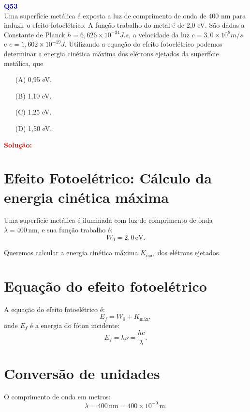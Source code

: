 \documentclass[a4paper,12pt]{article}
\begin{document}
\begin{flushleft}
\textbf{\textcolor{blue}{\Large Q53}}\\
\noindent
Uma superfície metálica é exposta a luz de comprimento de onda de 400 nm para induzir o efeito fotoelétrico. A função
trabalho do metal é de 2,0 eV. São dadas a Constante de Planck $h = 6{,}626 \times 10^{-34} J.s$, a velocidade da luz 
$c = 3{,}0 \times 10^8 m/s$ e $e = 1{,}602 \times 10^{-19} J$. Utilizando a equação do efeito fotoelétrico podemos 
determinar a energia cinética máxima dos elétrons ejetados da superfície metálica, que

\begin{itemize}
\item[(A)] 0,95 eV.
\item[(B)] 1,10 eV.
\item[(C)] 1,25 eV.
\item[(D)] 1,50 eV.
\end{itemize}

\vspace{0.5cm}

\textcolor{red}{\textbf{Solução:}}\\

\section*{Efeito Fotoelétrico: Cálculo da energia cinética máxima}

Uma superfície metálica é iluminada com luz de comprimento de onda \( \lambda = 400\,\mathrm{nm} \), e sua função trabalho é:
\[
W_0 = 2{,}0\,\mathrm{eV}.
\]

Queremos calcular a energia cinética máxima \( K_{\text{máx}} \) dos elétrons ejetados.

\section*{Equação do efeito fotoelétrico}

A equação do efeito fotoelétrico é:
\[
E_f = W_0 + K_{\text{máx}},
\]
onde \(E_f\) é a energia do fóton incidente:
\[
E_f = h\nu = \frac{hc}{\lambda}.
\]

\section*{Conversão de unidades}

O comprimento de onda em metros:
\[
\lambda = 400\,\mathrm{nm} = 400 \times 10^{-9}\,\mathrm{m}.
\]


\end{flushleft}
\end{document}

